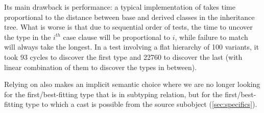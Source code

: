 \noindent
Its main drawback is performance: a typical implementation of 
 takes time proportional to the distance between base and 
derived classes in the inheritance tree. What is worse is that due to 
sequential order of tests, the time to uncover the type in the $i^{th}$ case 
clause will be proportional to $i$, while failure to match will always take the longest. 
In a test involving a flat hierarchy of 100 variants, it took 93 cycles to 
discover the first type and 22760 to discover the last (with linear combination 
of them to discover the types in between). %

Relying on  also makes an implicit semantic choice where we 
are no longer looking for the first/best-fitting type that is in subtyping 
relation, but for the first/best-fitting type to which a cast is possible from 
the source subobject (\textsection\ref{sec:specifics}).



